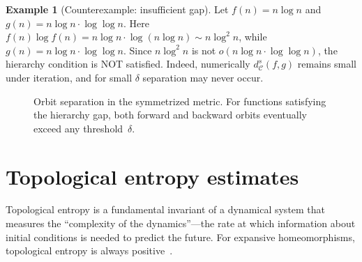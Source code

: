 \documentclass[11pt,a4paper]{article}
\theoremstyle{plain}
\theoremstyle{definition}
\newtheorem{exampleinner}[theoreminner]{Example}
\newenvironment{example}[1][]{\begin{exampleinner}[#1]}{\end{exampleinner}}
\newcommand{\C}{\mathcal{C}}
\begin{document}
\begin{example}[Counterexample: insufficient gap]\label{ex:counter-hierarchy}
Let $f(n)=n\log n$ and $g(n)=n\log n \cdot \log\log n$. 
Here $f(n)\log f(n) = n\log n \cdot \log(n\log n) \sim n\log^2 n$,
while $g(n) = n\log n \cdot \log\log n$. 
Since $n\log^2 n$ is not $o(n\log n \cdot \log\log n)$, 
the hierarchy condition is NOT satisfied. Indeed, numerically
$d_\C^s(f,g)$ remains small under iteration, and for small $\delta$
separation may never occur.
\end{example}

\begin{figure}[H]
\centering
{}
\caption{Orbit separation in the symmetrized metric.  For functions
satisfying the hierarchy gap, both forward and backward orbits
eventually exceed any threshold~$\delta$.}
\label{fig:hierarchy}
\end{figure}


\section{Topological entropy estimates}
\label{sec:entropy}

Topological entropy is a fundamental invariant of a dynamical
system that measures the ``complexity of the dynamics''---the rate
at which information about initial conditions is needed to predict
the future.  For expansive homeomorphisms, topological entropy is
always positive~\cite{bowen1975}.
\end{document}
